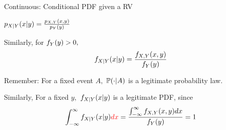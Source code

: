 \begin{frame}{Continuous:  Conditional PDF given a RV}

{
\medskip
\small
\plitemsep 0.1in
\bci

\item $p_{X|Y}(x|y) = \frac{p_{X,Y}(x,y)}{p_Y(y)}$

\item<2-> Similarly, for $f_Y(y) >0,$
$$
f_{X|Y}(x|y) = \frac{f_{X,Y}(x,y)}{f_Y(y)}
$$

\item<3-> Remember: For a fixed event $A,$ $\mathbb{P}( \cdot | A )$ is a legitimate probability law.

\item<4-> Similarly, For a fixed $y,$ $f_{X|Y}(x|y)$ is a legitimate PDF, since
$$
\int_{-\infty}^\infty f_{X|Y}(x|y) {\color{red} dx} = \frac{\int_{-\infty}^\infty f_{X,Y}(x,y) dx}{f_Y(y)} = 1
$$
\eci
}
{
\medskip
\small
\plitemsep 0.01in
\bci

\item<5-> 
\aleq{
\fxy &= \fy \cdot \fxcy = \fx \fycx
}

\item<6-> 

\item<7-> 
\eci
}
\end{frame}

